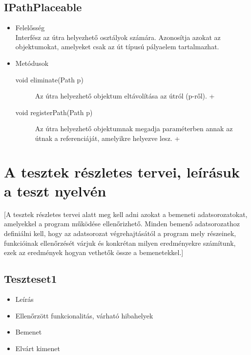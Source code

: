 \subsection{IPathPlaceable}
\begin{itemize}
\item Felelősség\\
Interfész az útra helyezhető osztályok számára. Azonosítja azokat az objektumokat, amelyeket csak az út típusú pályaelem tartalmazhat.

\item Metódusok\\
	\begin{description}
		\item[void eliminate(Path p)] Az útra helyezhető objektum eltávolítása az útról (p-ről). +
\item[void registerPath(Path p)] Az útra helyezhető objektumnak megadja paraméterben annak az útnak a referenciáját, amelyikre helyezve lesz. +



		
	\end{description}
\end{itemize}




\section{A tesztek részletes tervei, leírásuk a teszt nyelvén}
[A tesztek részletes tervei alatt meg kell adni azokat a bemeneti adatsorozatokat, amelyekkel a program működése ellenőrizhető. Minden bemenő adatsorozathoz definiálni kell, hogy az adatsorozat végrehajtásától a program mely részeinek, funkcióinak ellenőrzését várjuk és konkrétan milyen eredményekre számítunk, ezek az eredmények hogyan vethetők össze a bemenetekkel.]

\subsection{Teszteset1}
\begin{itemize}
\item Leírás\newline
{}
\item Ellenőrzött funkcionalitás, várható hibahelyek
\item Bemenet\newline
{}
\item Elvárt kimenet\newline
{}
\end{itemize}

